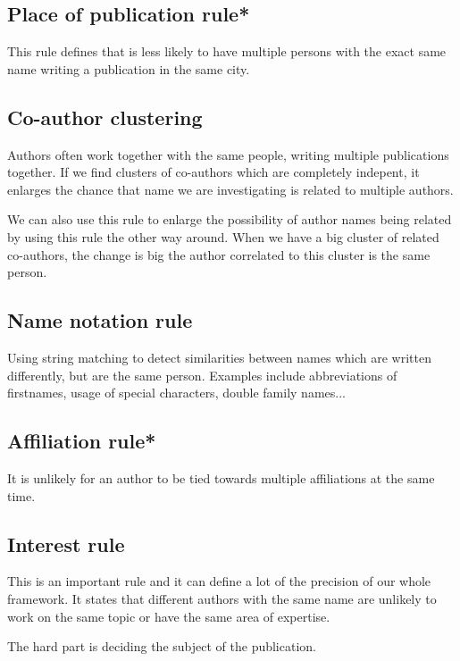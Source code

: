 \subsection{Place of publication rule*}

This rule defines that is less likely to have multiple persons with the exact same name writing a publication in the same city.

\subsection{Co-author clustering}


Authors often work together with the same people, writing multiple publications together. If we find clusters 
of co-authors which are completely indepent, it enlarges the chance that name we are investigating is related to multiple authors.

We can also use this rule to enlarge the possibility of author names being related by using this rule the other way around. When we have a big cluster of related co-authors, the change is big the author correlated to this cluster is the same person.

\subsection{Name notation rule}

Using string matching to detect similarities between names which are written differently, but are the same person. Examples include abbreviations of firstnames, usage of special characters, double family names...

\subsection{Affiliation rule*}

It is unlikely for an author to be tied towards multiple affiliations at the same time.

\subsection{Interest rule}

This is an important rule and it can define a lot of the precision of our whole framework. It states that different authors with the same name are unlikely to work on the same topic or have the same area of expertise.

The hard part is deciding the subject of the publication.